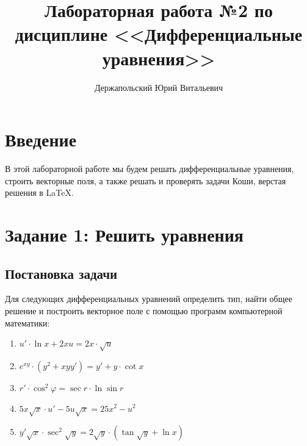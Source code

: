 \documentclass[14pt, a4paper, titlepage, fleqn]{extarticle}
\title{Лабораторная работа №2 по дисциплине <<Дифференциальные уравнения>>}
\author{Держапольский Юрий Витальевич}
\begin{document}
    \maketitle

    \tableofcontents

    \pagebreak

    \section{Введение}
        В этой лабораторной работе мы будем решать дифференциальные
        уравнения, строить векторные поля, а также решать и проверять задачи Коши,
        верстая решения в \LaTeX.

    \pagebreak

    \section{Задание 1: Решить уравнения}
        \subsection{Постановка задачи}
            Для следующих дифференциальных уравнений определить тип, найти общее
            решение и построить векторное поле с помощью программ компьютерной математики:
            \begin{enumerate}
                \item 
                \( 
                    u' \cdot \ln{x} + 2xu = 2x \cdot \sqrt{u}
                \)
                
                \item 
                \( 
                    e^{xy} \cdot \left( y^2 + xyy' \right) = y' + y \cdot \cot{x}
                \)
                
                \item 
                \( 
                    r' \cdot \cos^2{\varphi} = \sec{r} \cdot \ln{\sin{r}} 
                \)
                
                \item 
                \( 
                    5x\sqrt{x} \cdot u' -5u\sqrt{x} = 25x^2 - u^2 
                \)
                
                \item 
                \(
                    y' \sqrt{x} \cdot \sec^2{\sqrt{y}} = 2\sqrt{y} \cdot 
                    \left( \tan{\sqrt{y}+\ln{x}} \right) 
                \)
            \end{enumerate}
\end{document}
